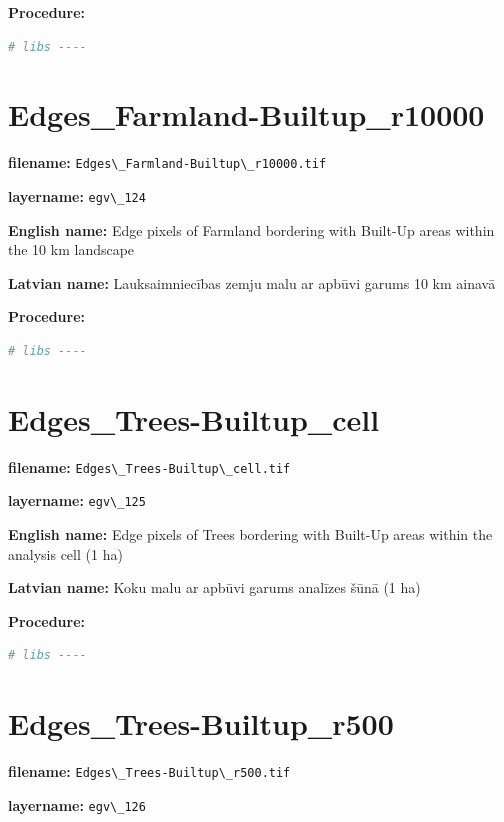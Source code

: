 \documentclass[
]{book}
\newcommand{\passthrough}[1]{#1}
\begin{document}
\textbf{Procedure:}

\begin{lstlisting}[language=R]
# libs ----
\end{lstlisting}

\section{Edges\_Farmland-Builtup\_r10000}\label{ch06.124}

\textbf{filename:} \passthrough{\lstinline!Edges\_Farmland-Builtup\_r10000.tif!}

\textbf{layername:} \passthrough{\lstinline!egv\_124!}

\textbf{English name:} Edge pixels of Farmland bordering with Built-Up areas within the 10 km landscape

\textbf{Latvian name:} Lauksaimniecības zemju malu ar apbūvi garums 10 km ainavā

\textbf{Procedure:}

\begin{lstlisting}[language=R]
# libs ----
\end{lstlisting}

\section{Edges\_Trees-Builtup\_cell}\label{ch06.125}

\textbf{filename:} \passthrough{\lstinline!Edges\_Trees-Builtup\_cell.tif!}

\textbf{layername:} \passthrough{\lstinline!egv\_125!}

\textbf{English name:} Edge pixels of Trees bordering with Built-Up areas within the analysis cell (1 ha)

\textbf{Latvian name:} Koku malu ar apbūvi garums analīzes šūnā (1 ha)

\textbf{Procedure:}

\begin{lstlisting}[language=R]
# libs ----
\end{lstlisting}

\section{Edges\_Trees-Builtup\_r500}\label{ch06.126}

\textbf{filename:} \passthrough{\lstinline!Edges\_Trees-Builtup\_r500.tif!}

\textbf{layername:} \passthrough{\lstinline!egv\_126!}
\end{document}
